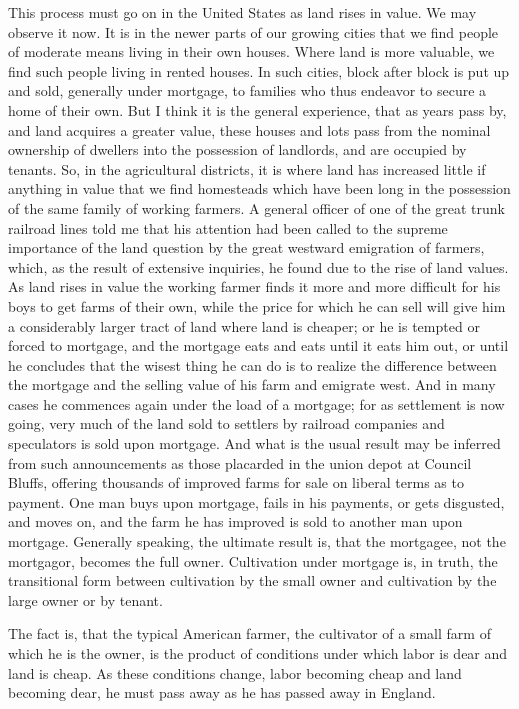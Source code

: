 \documentclass{book}
\begin{document}
This process must go on in the United States as land rises in value. We may observe it now. It is in the newer parts of our growing cities that we find people of moderate means living in their own houses. Where land is more valuable, we find such people living in rented houses. In such cities, block after block is put up and sold, generally under mortgage, to families who thus endeavor to secure a home of their own. But I think it is the general experience, that as years pass by, and land acquires a greater value, these houses and lots pass from the nominal ownership of dwellers into the possession of landlords, and are occupied by tenants. So, in the agricultural districts, it is where land has increased little if anything in value that we find homesteads which have been long in the possession of the same family of working farmers. A general officer of one of the great trunk railroad lines told me that his attention had been called to the supreme importance of the land question by the great westward emigration of farmers, which, as the result of extensive inquiries, he found due to the rise of land values. As land rises in value the working farmer finds it more and more difficult for his boys to get farms of their own, while the price for which he can sell will give him a considerably larger tract of land where land is cheaper; or he is tempted or forced to mortgage, and the mortgage eats and eats until it eats him out, or until he concludes that the wisest thing he can do is to realize the difference between the mortgage and the selling value of his farm and emigrate west. And in many cases he commences again under the load of a mortgage; for as settlement is now going, very much of the land sold to settlers by railroad companies and speculators is sold upon mortgage. And what is the usual result may be inferred from such announcements as those placarded in the union depot at Council Bluffs, offering thousands of improved farms for sale on liberal terms as to payment. One man buys upon mortgage, fails in his payments, or gets disgusted, and moves on, and the farm he has improved is sold to another man upon mortgage. Generally speaking, the ultimate result is, that the mortgagee, not the mortgagor, becomes the full owner. Cultivation under mortgage is, in truth, the transitional form between cultivation by the small owner and cultivation by the large owner or by tenant.

The fact is, that the typical American farmer, the cultivator of a small farm of which he is the owner, is the product of conditions under which labor is dear and land is cheap. As these conditions change, labor becoming cheap and land becoming dear, he must pass away as he has passed away in England.
\end{document}
